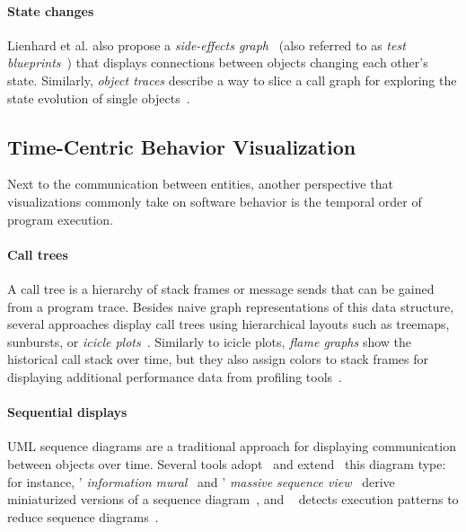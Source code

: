 \paragraph{State changes}

Lienhard et al. also propose a \emph{side-effects graph}~\cite{lienhard2009flow,fierz2009compass} (also referred to as \emph{test blueprints}~\cite{lienhard2008test}) that displays connections between objects changing each other's state.
Similarly, \emph{object traces} describe a way to slice a call graph for exploring the state evolution of single objects~\cite{thiede2023object}.

\subsection{Time-Centric Behavior Visualization}

Next to the communication between entities, another perspective that visualizations commonly take on software behavior is the temporal order of program execution.

\paragraph{Call trees}

A call tree is a hierarchy of stack frames or message sends that can be gained from a program trace.
Besides naive graph representations of this data structure, several approaches display call trees using hierarchical layouts such as treemaps, sunbursts, or \emph{icicle plots}~\cite{kruskal1983icicle,trumper2012viewfusion,woodburn2019interactive}.
Similarly to icicle plots, \emph{flame graphs} show the historical call stack over time, but they also assign colors to stack frames for displaying additional performance data from profiling tools~\cite{gregg2016flame}.

\paragraph{Sequential displays}

UML sequence diagrams are a traditional approach for displaying communication between objects over time.
Several tools adopt~\cite{systä2001shimba} and extend~\cite{hamouLhadj2004survey} this diagram type: for instance, ' \emph{information mural}~\cite{jerding1998information} and ' \emph{massive sequence view}~\cite{cornelissen2009trace} derive miniaturized versions of a sequence diagram~\cite[sec. 3.4]{lemieux2006visualization}, and ~\cite{dePauw1998execution} detects execution patterns to reduce sequence diagrams~\cite{hamouLhadj2004survey}.
